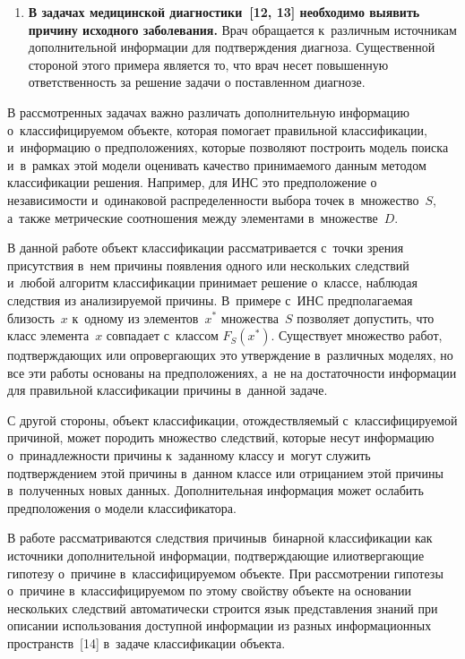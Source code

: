 \begin{multicols}{2}
\begin{enumerate}[1.]
  \item \textbf{В задачах медицинской диагностики~[12, 13] необходимо 
выявить причину исходного заболевания.} Врач обращается к~различным 
источникам дополнительной информации для подтверждения диагноза. 
Существенной стороной этого примера является то, что врач несет повышенную 
ответственность за решение задачи о поставленном диагнозе.
  \end{enumerate}
  
  В рассмотренных задачах важно различать дополнительную информацию 
о~классифицируемом объекте, которая помогает правильной классификации, 
и~информацию о предположениях, которые позволяют построить модель поиска 
и~в~рамках этой модели оценивать качество принимаемого данным методом 
классификации решения.
  Например, для ИНС это предположение о независимости и~одинаковой 
распределенности выбора точек в~множество~$S$, а~также метрические 
соотношения между элементами в~множестве~$D$. 
  
   В данной работе объект классификации рас\-смат\-ри\-ва\-ет\-ся с~точки зрения 
присутствия в~нем причины появления одного или нескольких следствий и~любой 
алгоритм классификации принимает решение о~классе, наблюдая следствия из 
анализируемой причины. В~примере с~ИНС предполагаемая близость~$x$ 
к~одному из элементов~$x^*$ множества~$S$ позволяет допустить, что класс 
элемента~$x$ совпадает с~классом $F_S(x^*)$. Существует множество работ, 
подтверждающих или опровергающих это утверждение в~различных моделях, но 
все эти работы основаны на предположениях, а~не на доста\-точ\-ности информации 
для правильной классификации причины в~данной задаче. 
  
  С другой стороны, объект классификации, отож\-дест\-в\-ля\-емый 
с~классифицируемой причиной, может породить множество следствий, которые 
несут информацию о~принадлежности причины к~заданному классу и~могут 
служить подтверждением этой причины в~данном классе или отрицанием этой 
причины в~полученных новых данных. Дополнительная информация может 
ослабить предположения о модели классификатора.
  
  В работе рассматриваются следствия причины\linebreak в~бинарной классификации как 
источники дополнительной информации, подтверждающие или\linebreak отвергающие 
гипотезу о~\mbox{причине} в~клас\-си\-фи\-ци\-ру\-емом объекте. При рассмотрении гипотезы 
о~причине в~классифицируемом по этому свойству \mbox{объекте} на основании 
нескольких следствий автоматически строится язык представления знаний при 
описании использования доступной информации из разных информационных 
пространств~[14] в~задаче классификации объекта.
  

\end{multicols}
